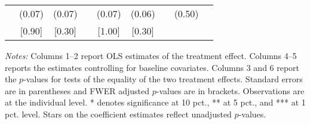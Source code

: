 \begin{table}[h]
{\begin{threeparttable}
\begin{tabular}{l*{8}{c}}
          &   (0.07)&   (0.07)&         &   (0.07)&   (0.06)&         &   (0.50)&         \\
          &   [0.90]&   [0.30]&         &   [1.00]&   [0.30]&         &         &         \\
\bottomrule \end{tabular} \begin{tablenotes}[flushleft] \footnotesize \item \emph{Notes:} Columns 1--2 report OLS estimates of the treatment effect. Columns 4--5 reports the estimates controlling for baseline covariates. Columns 3 and 6 report the \(p\)-values for tests of the equality of the two treatment effects. Standard errors are in parentheses and FWER adjusted \(p\)-values are in brackets. Observations are at the individual level. * denotes significance at 10 pct., ** at 5 pct., and *** at 1 pct. level. Stars on the coefficient estimates reflect unadjusted \(p\)-values. \end{tablenotes} \end{threeparttable} } \end{table}

